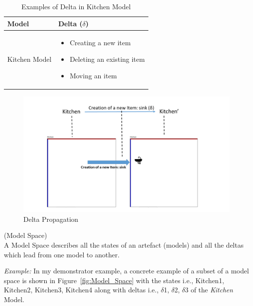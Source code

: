 \begin{table}
	\centering	
	\begin{tabular}{|p{5cm}|p{10cm}|}
		\hline
		\rowcolor[gray]{.8}	
		\textbf{Model} & \textbf{Delta ($\delta$)} \\
		\hline
		Kitchen Model & 
		\begin{itemize}
			\item Creating a new item
			\item Deleting an existing item
			\item Moving an item
		\end{itemize}\\
		\hline				
		
	\end{tabular}
	\caption{Examples of Delta in Kitchen Model}
	\label{tab:Examples_of_Delta}
\end{table}

\begin{figure}
	\includegraphics[width=1\textwidth]{figures/Delta_Propagation}
	\caption{Delta Propagation}
	\label{fig:Delta_Propagation}
\end{figure}

\begin{defn}\label{defModelSpace } (Model Space)\\
A Model Space describes all the states of an artefact (models) and all the deltas which lead from one model to another.
\end{defn}

\textit{Example:} In my demonstrator example, a concrete example of a subset of a model space is shown in Figure~\ref{fig:Model_Space} with the states i.e., Kitchen1, Kitchen2, Kitchen3, Kitchen4 along with deltas i.e., $\delta$1, $\delta$2, $\delta$3 of the \textit{Kitchen} Model.\\\\

